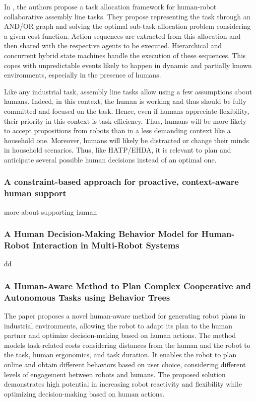 In \cite{johannsmeier2016hierarchical}, the authors propose a task allocation framework for human-robot collaborative assembly line tasks. They propose representing the task through an AND/OR graph and solving the optimal sub-task allocation problem considering a given cost function. Action sequences are extracted from this allocation and then shared with the respective agents to be executed. Hierarchical and concurrent hybrid state machines handle the execution of these sequences. This copes with unpredictable events likely to happen in dynamic and partially known environments, especially in the presence of humans.  

Like any industrial task, assembly line tasks allow using a few assumptions about humans. Indeed, in this context, the human is working and thus should be fully committed and focused on the task. Hence, even if humans appreciate flexibility, their priority in this context is task efficiency. Thus, humans will be more likely to accept propositions from robots than in a less demanding context like a household one. Moreover, humans will likely be distracted or change their minds in household scenarios. Thus, like HATP/EHDA, it is relevant to plan and anticipate several possible human decisions instead of an optimal one.

\subsubsection{A constraint-based approach for proactive, context-aware human support}
\label{w8}

more about supporting human

\subsubsection{A Human Decision-Making Behavior Model for Human-Robot Interaction in Multi-Robot Systems}
\label{w9}

dd

\subsubsection{A Human-Aware Method to Plan Complex Cooperative and Autonomous Tasks using Behavior Trees}
\label{w10}

The paper proposes a novel human-aware method for generating robot plans in industrial environments, allowing the robot to adapt its plan to the human partner and optimize decision-making based on human actions. The method models task-related costs considering distances from the human and the robot to the task, human ergonomics, and task duration. It enables the robot to plan online and obtain different behaviors based on user choice, considering different levels of engagement between robots and humans. The proposed solution demonstrates high potential in increasing robot reactivity and flexibility while optimizing decision-making based on human actions.

